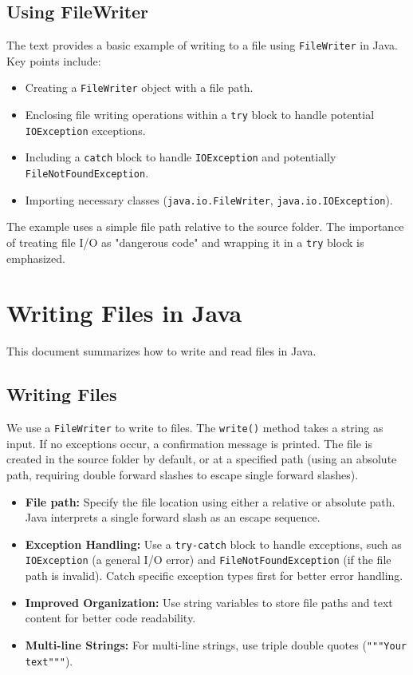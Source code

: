 \documentclass{article}
\begin{document}
\subsection{Using FileWriter}

The text provides a basic example of writing to a file using \texttt{FileWriter} in Java.  Key points include:

\begin{itemize}
    \item Creating a \texttt{FileWriter} object with a file path.
    \item Enclosing file writing operations within a \texttt{try} block to handle potential \texttt{IOException} exceptions.
    \item Including a \texttt{catch} block to handle \texttt{IOException} and potentially \texttt{FileNotFoundException}.
    \item Importing necessary classes (\texttt{java.io.FileWriter}, \texttt{java.io.IOException}).
\end{itemize}

The example uses a simple file path relative to the source folder.  The importance of treating file I/O as "dangerous code" and wrapping it in a \texttt{try} block is emphasized.


\section{Writing Files in Java}

This document summarizes how to write and read files in Java.

\subsection{Writing Files}

We use a \texttt{FileWriter} to write to files.  The \texttt{write()} method takes a string as input.  If no exceptions occur, a confirmation message is printed.  The file is created in the source folder by default, or at a specified path (using an absolute path, requiring double forward slashes to escape single forward slashes).

\begin{itemize}
    \item \textbf{File path:} Specify the file location using either a relative or absolute path.  Java interprets a single forward slash as an escape sequence.
    \item \textbf{Exception Handling:} Use a \texttt{try-catch} block to handle exceptions, such as \texttt{IOException} (a general I/O error) and \texttt{FileNotFoundException} (if the file path is invalid). Catch specific exception types first for better error handling.
    \item \textbf{Improved Organization:} Use string variables to store file paths and text content for better code readability.
    \item \textbf{Multi-line Strings:} For multi-line strings, use triple double quotes (\texttt{"""Your text"""}).
\end{itemize}
\end{document}
